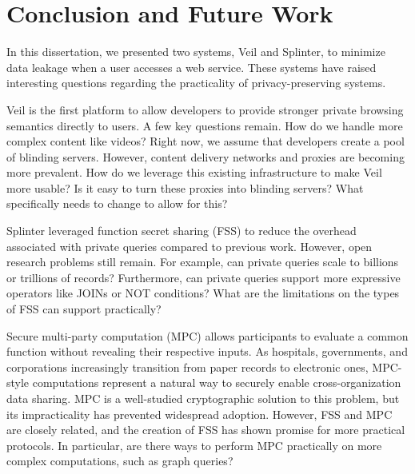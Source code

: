 \section{Conclusion and Future Work}
\label{chap:concl}

In this dissertation, we presented two systems, Veil and Splinter,
to minimize data leakage when a user accesses a web service. 
These systems have raised interesting questions
regarding the practicality of privacy-preserving systems.

Veil is the first platform to allow developers to provide stronger
private browsing semantics directly to users. A few key questions remain.
How do we handle more complex content like videos? Right now, we assume
that developers create a pool of blinding servers. However, content delivery
networks and proxies are becoming more prevalent. How do we leverage this
existing infrastructure to make Veil more usable? Is it easy to turn
these proxies into blinding servers? What specifically needs to change to allow
for this? 

Splinter leveraged
function secret sharing (FSS) to reduce the overhead associated with private queries compared to previous
work. However, open research problems still remain. For example, can private queries scale to billions
or trillions of records? Furthermore, can private queries support more expressive operators like JOINs or
NOT conditions? What are the limitations on the types of FSS can support practically?

Secure multi-party computation (MPC) allows participants to evaluate a common function without revealing
their respective inputs. As hospitals, governments, and corporations increasingly transition from
paper records to electronic ones, MPC-style computations represent a natural way to securely enable
cross-organization data sharing. MPC is a well-studied cryptographic solution to this problem, but its
impracticality has prevented widespread adoption. However, FSS and MPC are closely related, and 
the creation of FSS has shown promise for more practical protocols. In particular,
are there ways to perform MPC practically on more complex computations, such as graph queries?



